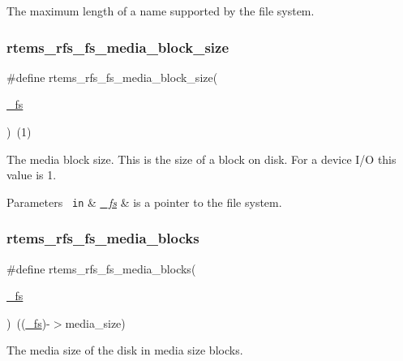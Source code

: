 The maximum length of a name supported by the file system. \mbox{\label{rtems-rfs-file-system_8h_a2e87a9ba4d97f0c4887c4f7669e132e3}} 
\subsubsection{\texorpdfstring{rtems\_rfs\_fs\_media\_block\_size}{rtems\_rfs\_fs\_media\_block\_size}}
{\footnotesize\ttfamily \#define rtems\+\_\+rfs\+\_\+fs\+\_\+media\+\_\+block\+\_\+size(\begin{DoxyParamCaption}\item[{}]{\mbox{\hyperlink{struct__fs}{\+\_\+fs}} }\end{DoxyParamCaption})~(1)}

The media block size. This is the size of a block on disk. For a device I/O this value is 1.


\begin{DoxyParams}[1]{Parameters}
\mbox{\texttt{ in}}  & {\em \mbox{\hyperlink{struct__fs}{\+\_\+fs}}} & is a pointer to the file system. \\
\hline
\end{DoxyParams}
\mbox{\label{rtems-rfs-file-system_8h_a7627e2a11f8c4dbdec5daeb96687e815}} 
\subsubsection{\texorpdfstring{rtems\_rfs\_fs\_media\_blocks}{rtems\_rfs\_fs\_media\_blocks}}
{\footnotesize\ttfamily \#define rtems\+\_\+rfs\+\_\+fs\+\_\+media\+\_\+blocks(\begin{DoxyParamCaption}\item[{}]{\mbox{\hyperlink{struct__fs}{\+\_\+fs}} }\end{DoxyParamCaption})~((\mbox{\hyperlink{struct__fs}{\+\_\+fs}})-\/$>$media\+\_\+size)}

The media size of the disk in media size blocks.


